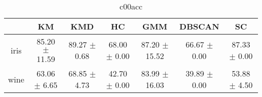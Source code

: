 \begin{table}
\centering
\begin{tabular}{ccccccc}
\toprule
 & KM & KMD & HC & GMM & DBSCAN & SC \\
\midrule
iris & 85.20 $\pm$ 11.59 & 89.27 $\pm$ 0.68 & 68.00 $\pm$ 0.00 & 87.20 $\pm$ 15.52 & 66.67 $\pm$ 0.00 & 87.33 $\pm$ 0.00 \\
wine & 63.06 $\pm$ 6.65 & 68.85 $\pm$ 4.73 & 42.70 $\pm$ 0.00 & 83.99 $\pm$ 16.03 & 39.89 $\pm$ 0.00 & 53.88 $\pm$ 4.50 \\
\bottomrule
\end{tabular}
\caption{c00acc}
\label{table:c00acc}
\end{table}
